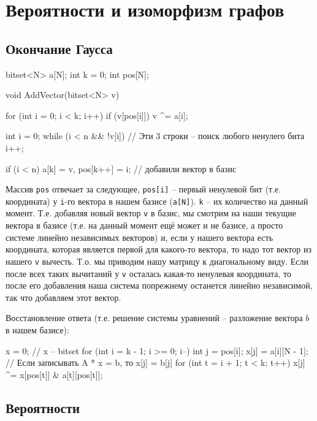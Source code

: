 \chapter{Вероятности и изоморфизм графов}

\section{Окончание Гаусса}

\begin{cppcode}
bitset<N> a[N];
int k = 0;
int pos[N];

void AddVector(bitset<N> v) {
    for (int i = 0; i < k; i++) {
        if (v[pos[i]])
            v ^= a[i];
    }

    int i = 0;
    while (i < n && !v[i]) // Эти 3 строки -- поиск любого ненулего бита
        i++;

    if (i < n)
        a[k] = v, pos[k++] = i; // добавили вектор в базис
}
\end{cppcode}

Массив \texttt{pos} отвечает за следующее, \texttt{pos[i]} -- первый ненулевой бит (т.е. координата) у \texttt{i}-го вектора в нашем базисе (\texttt{a[N]}).
\texttt{k} -- их количество на данный момент. Т.е. добавляя новый вектор \texttt{v} в базис, мы смотрим на наши текущие вектора в базисе
(т.е. на данный момент ещё может и не базисе, а просто системе линейно независимых векторов) и, если у нашего вектора есть координата, которая
является первой для какого-то вектора, то надо тот вектор из нашего \texttt{v} вычесть. Т.о. мы приводим нашу матрицу к диагональному виду.
Если после всех таких вычитаний у \texttt{v} осталась какая-то ненулевая координата, то после его добавления наша система попрежнему останется 
линейно независимой, так что добавляем этот вектор.

Восстановление ответа (т.е. решение системы уравнений -- разложение вектора $b$ в нашем базисе):

\begin{cppcode}
x = 0; // x -- bitset
for (int i = k - 1; i >= 0; i--) {
    int j = pos[i];
    x[j] = a[i][N - 1]; // Если записывать A * x = b, то x[j] = b[j]
    for (int t = i + 1; t < k; t++) {
        x[j] ^= x[pos[t]] & a[t][pos[t]];
    }
}
\end{cppcode}


\section{Вероятности}

